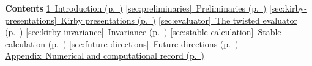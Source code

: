 \begin{center}
  \footnotesize
  \textbf{Contents}\quad
  \hyperref[page:introduction]{1\ Introduction
  (p.~\pageref*{page:introduction})}
  \enspace\textperiodcentered\enspace
  \hyperref[sec:preliminaries]{\ref*{sec:preliminaries}\ Preliminaries
  (p.~\pageref*{sec:preliminaries})}
  \enspace\textperiodcentered\enspace
  \hyperref[sec:kirby-presentations]{\ref*{sec:kirby-presentations}\ Kirby presentations
  (p.~\pageref*{sec:kirby-presentations})}
  \enspace\textperiodcentered\enspace
  \hyperref[sec:evaluator]{\ref*{sec:evaluator}\ The twisted evaluator
  (p.~\pageref*{sec:evaluator})}
  \enspace\textperiodcentered\enspace
  \hyperref[sec:kirby-invariance]{\ref*{sec:kirby-invariance}\ Invariance
  (p.~\pageref*{sec:kirby-invariance})}
  \enspace\textperiodcentered\enspace
  \hyperref[sec:stable-calculation]{\ref*{sec:stable-calculation}\ Stable calculation
  (p.~\pageref*{sec:stable-calculation})}
  \enspace\textperiodcentered\enspace
  \hyperref[sec:future-directions]{\ref*{sec:future-directions}\ Future directions
  (p.~\pageref*{sec:future-directions})}
  \enspace\textperiodcentered\enspace
  \hyperref[app:computational-record]{Appendix\ Numerical and computational record
  (p.~\pageref*{app:computational-record})}
\end{center}
\vspace{0.25em}
